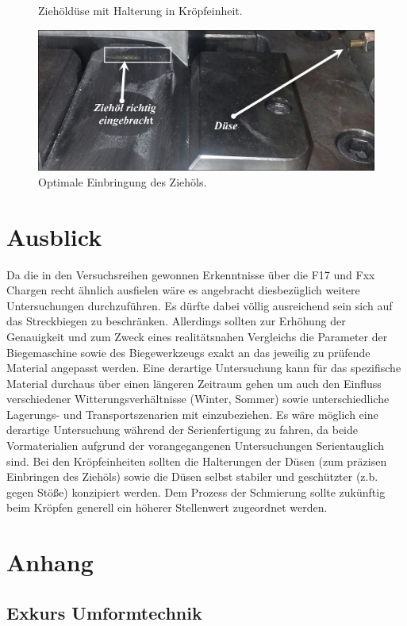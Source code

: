 \documentclass[12pt,a4paper,parskip,twoside,BCOR5mm,headsepline]{scrartcl}
\begin{document}
\begin{description*}
\begin{itemize*}
\begin{figure}[H]
\caption{Ziehöldüse mit Halterung in Kröpfeinheit.}
\label{fig:Ziehduese}
\end{figure}

\begin{figure}[H]
\centering
\includegraphics[width=.8\textwidth]{DueseGut}
\caption{Optimale Einbringung des Ziehöls.}
\label{fig:DueseGut}
\end{figure}


\newpage

\section{Ausblick}
Da die in den Versuchsreihen gewonnen Erkenntnisse über die F17 und Fxx Chargen recht ähnlich ausfielen wäre es angebracht diesbezüglich weitere Untersuchungen durchzuführen. Es dürfte dabei völlig ausreichend sein sich auf das Streckbiegen zu beschränken. Allerdings sollten zur Erhöhung der Genauigkeit  und zum Zweck eines realitätsnahen Vergleichs die Parameter der Biegemaschine sowie des Biegewerkzeugs exakt an das jeweilig zu prüfende Material angepasst werden.  Eine derartige Untersuchung kann für das spezifische Material durchaus über einen längeren Zeitraum gehen um auch den Einfluss verschiedener Witterungsverhältnisse (Winter, Sommer) sowie unterschiedliche Lagerungs- und Transportszenarien mit einzubeziehen. Es wäre möglich eine derartige Untersuchung während der Serienfertigung zu fahren, da  beide Vormaterialien aufgrund der vorangegangenen Untersuchungen Serientauglich sind.
Bei den Kröpfeinheiten sollten die Halterungen der Düsen (zum präzisen Einbringen des Ziehöls) sowie die Düsen selbst stabiler und geschützter (z.b. gegen Stöße) konzipiert werden. Dem Prozess der Schmierung sollte  zukünftig beim Kröpfen generell ein höherer Stellenwert zugeordnet werden.




\newpage
\section{Anhang}
\subsection{Exkurs Umformtechnik}



\end{itemize*}
\end{description*}
\end{document}
